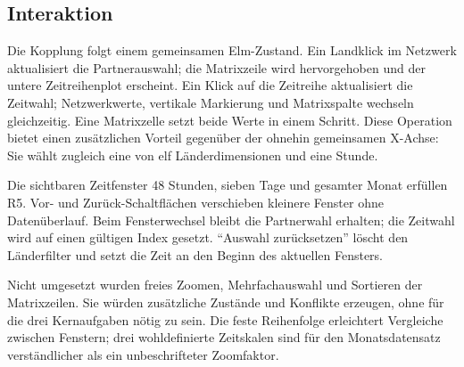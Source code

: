 \subsection{Interaktion}
\label{sec:interaktion}

Die Kopplung folgt einem gemeinsamen Elm-Zustand. Ein Landklick im Netzwerk
aktualisiert die Partnerauswahl; die Matrixzeile wird hervorgehoben und der
untere Zeitreihenplot erscheint. Ein Klick auf die Zeitreihe aktualisiert die
Zeitwahl; Netzwerkwerte, vertikale Markierung und Matrixspalte wechseln
gleichzeitig. Eine Matrixzelle setzt beide Werte in einem Schritt.
Diese Operation bietet einen zusätzlichen Vorteil gegenüber der ohnehin
gemeinsamen X-Achse: Sie wählt zugleich eine von elf Länderdimensionen und eine
Stunde.

Die sichtbaren Zeitfenster 48 Stunden, sieben Tage und gesamter Monat erfüllen
R5. Vor- und Zurück-Schaltflächen verschieben kleinere Fenster ohne
Datenüberlauf. Beim Fensterwechsel bleibt die Partnerwahl erhalten; die
Zeitwahl wird auf einen gültigen Index gesetzt. ``Auswahl zurücksetzen'' löscht
den Länderfilter und setzt die Zeit an den Beginn des aktuellen Fensters.

Nicht umgesetzt wurden freies Zoomen, Mehrfachauswahl und Sortieren der
Matrixzeilen. Sie würden zusätzliche Zustände und Konflikte erzeugen, ohne für
die drei Kernaufgaben nötig zu sein. Die feste Reihenfolge erleichtert
Vergleiche zwischen Fenstern; drei wohldefinierte Zeitskalen sind für den
Monatsdatensatz verständlicher als ein unbeschrifteter Zoomfaktor.
